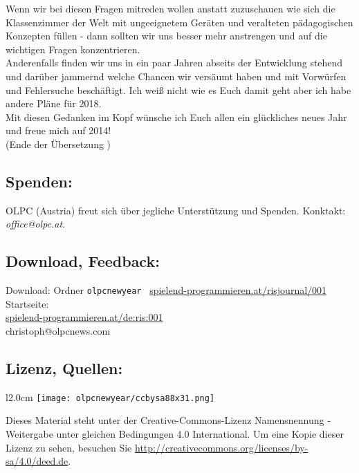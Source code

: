 \documentclass[10pt,a4paper,ngerman,twoside]{article} %
\begin{document}
Wenn wir bei diesen Fragen mitreden wollen anstatt zuzuschauen wie sich die Klassenzimmer der Welt mit ungeeignetem Geräten und veralteten pädagogischen Konzepten füllen - dann sollten wir uns besser mehr anstrengen und auf die wichtigen Fragen konzentrieren. \\

Anderenfalls finden wir uns in ein paar Jahren abseits der Entwicklung stehend und darüber jammernd welche Chancen wir versäumt haben und mit Vorwürfen und Fehlersuche beschäftigt. Ich weiß nicht wie es Euch damit geht aber ich habe andere Pläne für 2018. \\

Mit diesen Gedanken im Kopf wünsche ich Euch allen ein glückliches neues Jahr und freue mich auf 2014! \\

(Ende der Übersetzung )


\subsection*{Spenden:}

OLPC (Austria) freut sich über jegliche Unterstützung und Spenden. Konktakt: \textit{office@olpc.at}. \\

\subsection*{Download, Feedback:}
\footnotesize{
Download: Ordner \texttt{olpcnewyear} \Mundus\ \href{http://spielend-programmieren.at/risjournal/001}{spielend-programmieren.at/risjournal/001}\\
Startseite:\\
\href{http://spielend-programmieren.at/de:ris:001}{spielend-programmieren.at/de:ris:001}\\ 
\Letter\:  christoph@olpcnews.com \\}
\normalsize
 

\subsection*{Lizenz, Quellen:}
\begin{wrapfigure}{l}{2.0cm}
\texttt{[image: olpcnewyear/ccbysa88x31.png]}
\end{wrapfigure}
Dieses Material steht unter der Creative-Commons-Lizenz Namensnennung - Weitergabe unter gleichen Bedingungen 4.0 International. Um eine Kopie dieser Lizenz zu sehen, besuchen Sie \url{http://creativecommons.org/licenses/by-sa/4.0/deed.de}.
\end{document}
